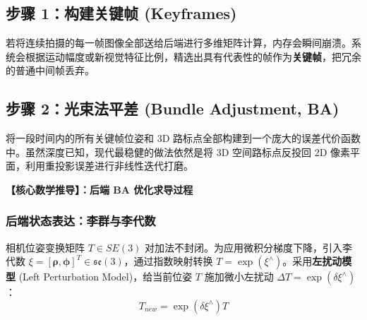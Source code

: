 \documentclass[12pt,a4paper]{article}
\begin{document}
\subsection{步骤 1：构建关键帧 (Keyframes)}
若将连续拍摄的每一帧图像全部送给后端进行多维矩阵计算，内存会瞬间崩溃。系统会根据运动幅度或新视觉特征比例，精选出具有代表性的帧作为\textbf{关键帧}，把冗余的普通中间帧丢弃。

\subsection{步骤 2：光束法平差 (Bundle Adjustment, BA)}
将一段时间内的所有关键帧位姿和 3D 路标点全部构建到一个庞大的误差代价函数中。虽然深度已知，现代最稳健的做法依然是将 3D 空间路标点反投回 2D 像素平面，利用重投影误差进行非线性迭代打磨。

\vspace{0.3cm}
\textbf{【核心数学推导】：后端 BA 优化求导过程}

\subsubsection{后端状态表达：李群与李代数}
相机位姿变换矩阵 $T \in SE(3)$ 对加法不封闭。为应用微积分梯度下降，引入李代数 $\xi = [\bm{\rho}, \bm{\phi}]^T \in \mathfrak{se}(3)$，通过指数映射转换 $T = \exp(\xi^{\wedge})$。采用\textbf{左扰动模型} (Left Perturbation Model)，给当前位姿 $T$ 施加微小左扰动 $\Delta T = \exp(\delta \xi^{\wedge})$：
\begin{equation}
    T_{new} = \exp(\delta \xi^{\wedge}) T
\end{equation}
\end{document}
